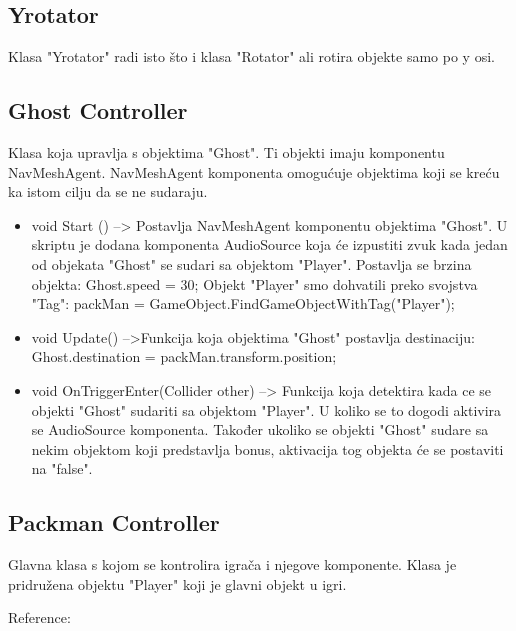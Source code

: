 \subsection{Yrotator}
Klasa "Yrotator" radi isto što i klasa "Rotator" ali rotira objekte samo po y osi.

\subsection{Ghost Controller}
Klasa koja upravlja s objektima "Ghost". Ti objekti imaju komponentu NavMeshAgent. NavMeshAgent komponenta omogućuje objektima koji se kreću ka istom cilju da se ne sudaraju.

\begin{itemize}
	
\item void Start () --> Postavlja NavMeshAgent komponentu objektima "Ghost". U skriptu je dodana komponenta AudioSource koja će izpustiti zvuk kada jedan od objekata "Ghost" se sudari sa objektom "Player".
Postavlja se brzina objekta: Ghost.speed = 30;
Objekt "Player" smo dohvatili preko svojstva "Tag": 
packMan = GameObject.FindGameObjectWithTag("Player");

\item void Update() -->Funkcija koja objektima "Ghost" postavlja destinaciju: Ghost.destination = packMan.transform.position;

\item void OnTriggerEnter(Collider other) --> Funkcija koja detektira kada ce se objekti "Ghost" sudariti sa objektom "Player". U koliko se to dogodi aktivira se AudioSource komponenta. Također ukoliko se objekti "Ghost" sudare sa nekim objektom koji predstavlja bonus, aktivacija tog objekta će se postaviti na "false".

\end{itemize}

\subsection{Packman Controller}
Glavna klasa s kojom se kontrolira igrača i njegove komponente. Klasa je pridružena objektu "Player" koji je glavni objekt u igri. 

Reference:

